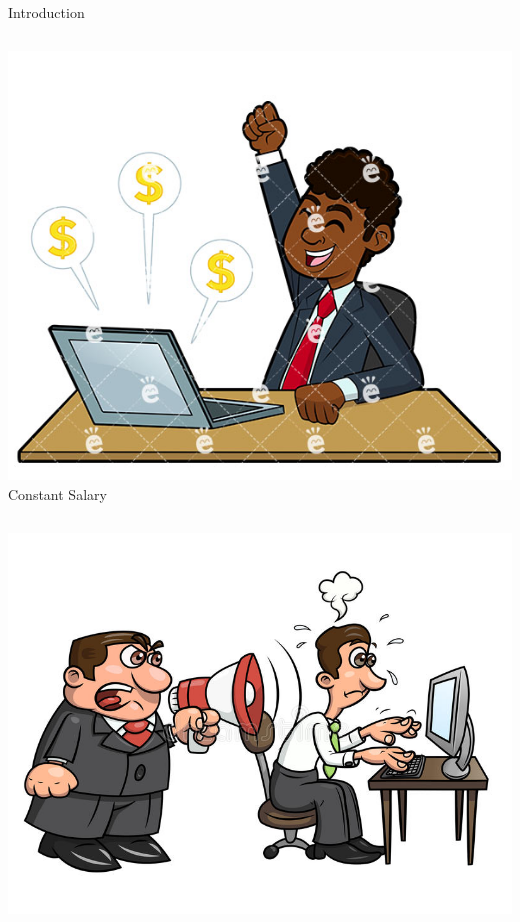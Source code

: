 \begin{frame}{Introduction}
\begin{columns}
\begin{column}{.4\textwidth}
        \begin{center} \includegraphics[scale=0.17]{figures/money.jpg}\\
        Constant Salary
        \end{center}
    \end{column}
    \hspace*{-0.5cm}
\end{columns}
\vspace*{-0.4cm}
\begin{columns}
    \begin{column}{.4\textwidth}
        \begin{center} \includegraphics[scale=0.45]{figures/boss.jpg}

\end{center}
\end{column}
\end{columns}
\end{frame}
